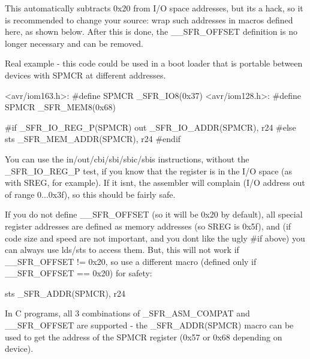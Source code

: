 This automatically subtracts 0x20 from I/O space addresses, but it\textquotesingle{}s a hack, so it is recommended to change your source\+: wrap such addresses in macros defined here, as shown below. After this is done, the {\ttfamily \+\_\+\+\_\+\+S\+F\+R\+\_\+\+O\+F\+F\+S\+ET} definition is no longer necessary and can be removed.

Real example -\/ this code could be used in a boot loader that is portable between devices with {\ttfamily S\+P\+M\+CR} at different addresses.

\begin{DoxyVerb}<avr/iom163.h>: #define SPMCR _SFR_IO8(0x37)
<avr/iom128.h>: #define SPMCR _SFR_MEM8(0x68)
\end{DoxyVerb}



\begin{DoxyCode}
\textcolor{preprocessor}{#if \_SFR\_IO\_REG\_P(SPMCR)}
    out \_SFR\_IO\_ADDR(SPMCR), r24
\textcolor{preprocessor}{#else}
    sts \_SFR\_MEM\_ADDR(SPMCR), r24
\textcolor{preprocessor}{#endif}
\end{DoxyCode}


You can use the {\ttfamily in/out/cbi/sbi/sbic/sbis} instructions, without the {\ttfamily \+\_\+\+S\+F\+R\+\_\+\+I\+O\+\_\+\+R\+E\+G\+\_\+P} test, if you know that the register is in the I/O space (as with {\ttfamily S\+R\+EG}, for example). If it isn\textquotesingle{}t, the assembler will complain (I/O address out of range 0...0x3f), so this should be fairly safe.

If you do not define {\ttfamily \+\_\+\+\_\+\+S\+F\+R\+\_\+\+O\+F\+F\+S\+ET} (so it will be 0x20 by default), all special register addresses are defined as memory addresses (so {\ttfamily S\+R\+EG} is 0x5f), and (if code size and speed are not important, and you don\textquotesingle{}t like the ugly \#if above) you can always use lds/sts to access them. But, this will not work if {\ttfamily \+\_\+\+\_\+\+S\+F\+R\+\_\+\+O\+F\+F\+S\+ET} != 0x20, so use a different macro (defined only if {\ttfamily \+\_\+\+\_\+\+S\+F\+R\+\_\+\+O\+F\+F\+S\+ET} == 0x20) for safety\+:


\begin{DoxyCode}
sts \_SFR\_ADDR(SPMCR), r24
\end{DoxyCode}


In C programs, all 3 combinations of {\ttfamily \+\_\+\+S\+F\+R\+\_\+\+A\+S\+M\+\_\+\+C\+O\+M\+P\+AT} and {\ttfamily \+\_\+\+\_\+\+S\+F\+R\+\_\+\+O\+F\+F\+S\+ET} are supported -\/ the {\ttfamily \+\_\+\+S\+F\+R\+\_\+\+A\+D\+D\+R(\+S\+P\+M\+C\+R)} macro can be used to get the address of the {\ttfamily S\+P\+M\+CR} register (0x57 or 0x68 depending on device). 